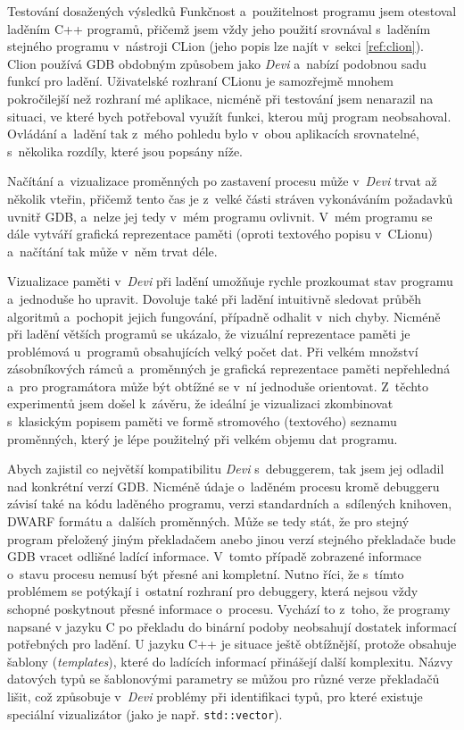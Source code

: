 \documentclass[czech,bachelor,male,python,dept460,hidelinks]{diploma}						%
\newcommand{\parspace}[1][]{
	\ifthenelse{\isempty{#1}}{\vspace{0mm}}{\vspace{#1}}
	\par
}
\begin{document}
\begin{section}{Testování dosažených výsledků}
	Funkčnost a~použitelnost programu jsem otestoval laděním C++ programů, přičemž jsem vždy jeho použití srovnával s~laděním stejného programu v~nástroji
	CLion (jeho popis lze najít v~sekci \ref{ref:clion}). Clion používá GDB obdobným způsobem jako \textit{Devi} a~nabízí podobnou sadu funkcí pro ladění.
	Uživatelské rozhraní CLionu je samozřejmě mnohem pokročilejší než rozhraní mé aplikace, nicméně při testování jsem nenarazil na situaci,
	ve které bych potřeboval využít funkci, kterou můj program neobsahoval. Ovládání a~ladění tak z~mého pohledu bylo v~obou aplikacích srovnatelné,
	s~několika rozdíly, které jsou popsány níže.

	\parspace Načítání a~vizualizace proměnných po zastavení procesu může v~\textit{Devi} trvat až několik vteřin, přičemž tento čas je z~velké části stráven
	vykonáváním požadavků uvnitř GDB, a~nelze jej tedy v~mém programu ovlivnit. V~mém programu se dále vytváří grafická reprezentace paměti
	(oproti textového popisu v~CLionu) a~načítání tak může v~něm trvat déle.

	\parspace Vizualizace paměti v~\textit{Devi} při ladění umožňuje rychle prozkoumat stav programu a~jednoduše ho upravit.
	Dovoluje také při ladění intuitivně sledovat průběh algoritmů a~pochopit jejich fungování, případně odhalit v~nich chyby.
	Nicméně při ladění větších programů se ukázalo, že vizuální reprezentace paměti je problémová u~programů obsahujících velký počet dat.
	Při velkém množství zásobníkových rámců a~proměnných je grafická reprezentace paměti nepřehledná a~pro programátora může být obtížné se v~ní
	jednoduše orientovat. Z~těchto experimentů jsem došel k~závěru, že ideální je vizualizaci zkombinovat s~klasickým popisem paměti ve formě stromového
	(textového) seznamu proměnných, který je lépe použitelný při velkém objemu dat programu.
	
	\parspace Abych zajistil co největší kompatibilitu \textit{Devi} s~debuggerem, tak jsem jej odladil nad konkrétní verzí GDB. Nicméně údaje o~laděném procesu kromě
	debuggeru závisí také na kódu laděného programu, verzi standardních a~sdílených knihoven, DWARF formátu a~dalších proměnných.
	Může se tedy stát, že pro stejný program přeložený jiným překladačem anebo jinou verzí stejného překladače bude GDB vracet odlišné ladící informace.
	V~tomto případě zobrazené informace o~stavu procesu nemusí být přesné ani kompletní. Nutno říci, že s~tímto problémem
	se potýkají i~ostatní rozhraní pro debuggery, která nejsou vždy schopné poskytnout přesné informace o~procesu. Vychází to z~toho, že programy napsané v jazyku C
	po překladu do binární podoby neobsahují dostatek informací potřebných pro ladění. U jazyku C++ je situace ještě obtížnější, protože obsahuje šablony
	(\textit{templates}), které do ladících informací přinášejí další komplexitu. Názvy datových typů se šablonovými parametry se můžou pro
	různé verze překladačů lišit, což způsobuje v~\textit{Devi} problémy při identifikaci typů, pro které existuje speciální vizualizátor
	(jako je např. \texttt{std::vector}).
\end{section}
\end{document}
